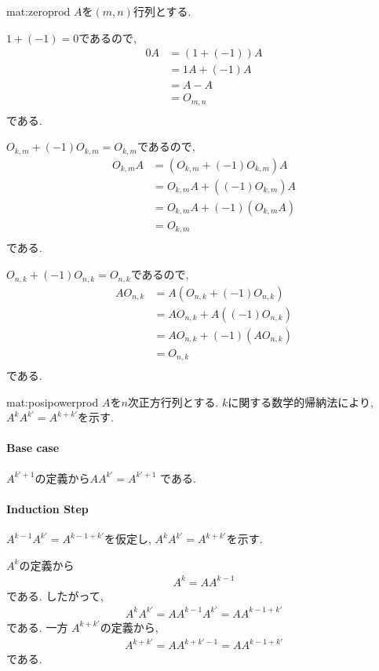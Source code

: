 \begin{proofof}{mat:zeroprod}
  $A$を$(m,n)$行列とする.

  $1+(-1)=0$であるので,
  \begin{align*}
    0A&=(1+(-1))A\\
    &=1A+(-1)A\\
    &=A-A\\
    &=O_{m,n}\\
  \end{align*}
  である.

  $O_{k,m}+(-1)O_{k,m}=O_{k,m}$であるので,
  \begin{align*}
    O_{k,m}A&=(O_{k,m}+(-1)O_{k,m})A\\
    &=O_{k,m}A+((-1)O_{k,m})A\\
    &=O_{k,m}A+(-1)(O_{k,m}A)\\
    &=O_{k,m}\\
  \end{align*}
  である.

  $O_{n,k}+(-1)O_{n,k}=O_{n,k}$であるので,
  \begin{align*}
    AO_{n,k}&=A(O_{n,k}+(-1)O_{n,k})\\
    &=AO_{n,k}+A((-1)O_{n,k})\\
    &=AO_{n,k}+(-1)(AO_{n,k})\\
    &=O_{n,k}\\
  \end{align*}
  である.
\end{proofof}

\begin{proofof*}{mat:posipower}{prod}
  $A$を$n$次正方行列とする.
  $k$に関する数学的帰納法により, $A^{k}A^{k'}=A^{k+k'}$を示す.
  \paragraph{Base case}
  $A^{k'+1}$の定義から$AA^{k'}=A^{k'+1}$
  である.
  
  \paragraph{Induction Step}
  $A^{k-1}A^{k'}=A^{k-1+k'}$を仮定し,
  $A^{k}A^{k'}=A^{k+k'}$を示す.

  $A^{k}$の定義から
  \begin{align*}
    A^{k}=AA^{k-1}
  \end{align*}
  である. したがって,
  \begin{align*}
    A^{k}A^{k'}=AA^{k-1}A^{k'}=AA^{k-1+k'}
  \end{align*}
  である.
  一方 $A^{k+k'}$の定義から,
  \begin{align*}
    A^{k+k'}=AA^{k+k'-1}=AA^{k-1+k'}
  \end{align*}
  である.
\end{proofof*}

